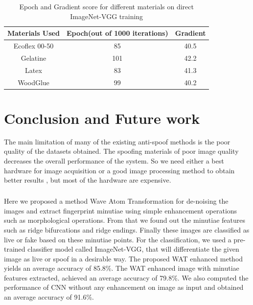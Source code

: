 \begin{table}[h]
\caption {Epoch and Gradient score for different materials on direct ImageNet-VGG training} \label{tab:4} 
\begin{center}
\begin{tabular}{|c|c|c|} 
 \hline
 Materials Used  & Epoch(out of 1000 iterations) & Gradient\\ 
 \hline
 Ecoflex 00-50 & 85 & 40.5\\
 \hline
Gelatine & 101 & 42.2\\
 \hline
Latex & 83 & 41.3\\
\hline
WoodGlue & 99 & 40.2\\
\hline
\end{tabular}
\end{center}
\end{table}

\chapter{Conclusion and Future work}
The main limitation of many of the existing anti-spoof methods is the poor quality of the datasets obtained. The spoofing materials of poor image quality decreases the overall performance of the system. So we need either a best hardware for image acquisition or a good image processing method to obtain better results , but most of the hardware are expensive. 
\paragraph{}Here we proposed a method Wave Atom Transformation for de-noising the images and extract fingerprint minutiae using simple enhancement operations such as morphological operations. From that we found out the minutiae features such as ridge bifurcations and ridge endings. Finally these images are classified as live or fake based on these minutiae points. For the classification, we used a pre-trained classifier model called ImageNet-VGG, that will differentiate the given image as live or spoof in a desirable way. The proposed WAT enhanced method yields an average accuracy of 85.8\%. The WAT enhanced image with minutiae features extracted, achieved an average accuracy of 79.8\%. We also computed the performance of CNN without any enhancement on image as input and obtained an average accuracy of 91.6\%.


